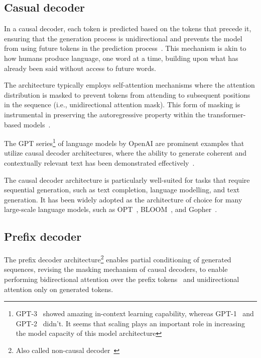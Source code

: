 \subsection{Casual decoder}
\label{subsec:casual-decoder}

In a causal decoder, each token is predicted based on the tokens that precede it, ensuring that the generation process is unidirectional and prevents the model from using future tokens in the prediction process~\cite{vaswani2023attention}.
This mechanism is akin to how humans produce language, one word at a time, building upon what has already been said without access to future words.

The architecture typically employs self-attention mechanisms where the attention distribution is masked to prevent tokens from attending to subsequent positions in the sequence (i.e., unidirectional attention mask).
This form of masking is instrumental in preserving the autoregressive property within the transformer-based models~\cite{radford2019language}.

The GPT series\footnote{GPT-3~\cite{brown2020language} showed amazing in-context learning capability, whereas GPT-1~\cite{radford2018improving} and GPT-2~\cite{radford2019language} didn't. It seems that scaling plays an important role in increasing the model capacity of this model architecture} of language models by OpenAI are prominent examples that utilize causal decoder architectures, where the ability to generate coherent and contextually relevant text has been demonstrated effectively~\cite{brown2020language}.

The causal decoder architecture is particularly well-suited for tasks that require sequential generation, such as text completion, language modelling, and text generation.
It has been widely adopted as the architecture of choice for many large-scale language models, such as OPT~\cite{zhang2022opt}, BLOOM~\cite{workshop2023bloom}, and Gopher~\cite{rae2021scaling}.

\subsection{Prefix decoder}
\label{subsec:prefix-decoder}

The prefix decoder architecture\footnote{Also called non-causal decoder~\cite{zhang2022examining}} enables partial conditioning of generated sequences, revising the masking mechanism of causal decoders, to enable performing bidirectional attention over the prefix tokens~\cite{dong2019unified} and unidirectional attention only on generated tokens.

